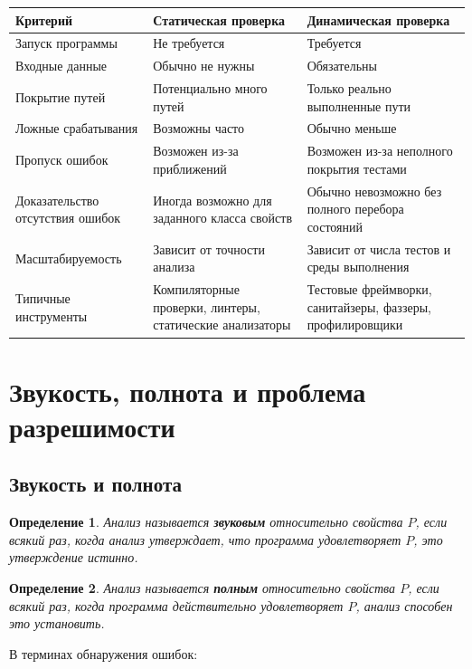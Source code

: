 \documentclass[12pt,a4paper]{article}
\newtheorem{definition}{Определение}
\begin{document}
\begin{center}
\begin{tabular}{p{4cm} p{5cm} p{5cm}}
\toprule
Критерий & Статическая проверка & Динамическая проверка \\
\midrule
Запуск программы & Не требуется & Требуется \\
Входные данные & Обычно не нужны & Обязательны \\
Покрытие путей & Потенциально много путей & Только реально выполненные пути \\
Ложные срабатывания & Возможны часто & Обычно меньше \\
Пропуск ошибок & Возможен из-за приближений & Возможен из-за неполного покрытия тестами \\
Доказательство отсутствия ошибок & Иногда возможно для заданного класса свойств & Обычно невозможно без полного перебора состояний \\
Масштабируемость & Зависит от точности анализа & Зависит от числа тестов и среды выполнения \\
Типичные инструменты & Компиляторные проверки, линтеры, статические анализаторы & Тестовые фреймворки, санитайзеры, фаззеры, профилировщики \\
\bottomrule
\end{tabular}
\end{center}

\section{Звукость, полнота и проблема разрешимости}

\subsection{Звукость и полнота}

\begin{definition}
Анализ называется \textbf{звуковым} относительно свойства $P$, если всякий раз, когда анализ утверждает, что программа удовлетворяет $P$, это утверждение истинно.
\end{definition}

\begin{definition}
Анализ называется \textbf{полным} относительно свойства $P$, если всякий раз, когда программа действительно удовлетворяет $P$, анализ способен это установить.
\end{definition}

В терминах обнаружения ошибок:
\end{document}
